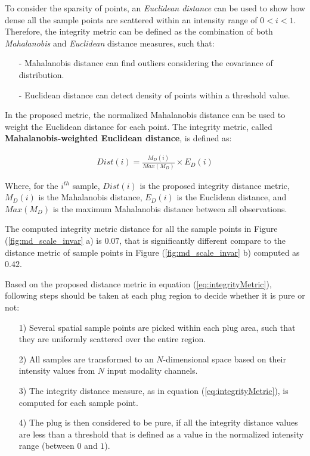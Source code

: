 To consider the sparsity of points, an \textit{Euclidean distance} can be used to show how dense all the sample points are scattered within an intensity range of $0<i<1$. Therefore, the integrity metric can be defined as the combination of both \textit{Mahalanobis} and \textit{Euclidean} distance measures, such that:

\begin{itemize}
    \item[-] Mahalanobis distance can find outliers considering the covariance of distribution.
    \item[-] Euclidean distance can detect density of points within a threshold value.
\end{itemize}

In the proposed metric, the normalized Mahalanobis distance can be used to weight the Euclidean distance for each point. The integrity metric, called \textbf{Mahalanobis-weighted Euclidean distance}, is defined as:

\begin{equation}
\label{eq:integrityMetric}
\begin{gathered}
Dist(i) = \frac{M_D(i)}{Max(M_D)} \times E_D(i)
\end{gathered}
\end{equation}

Where, for the $i^{th}$ sample, $Dist(i)$ is the proposed integrity distance metric, $M_D(i)$ is the Mahalanobis distance, $E_D(i)$ is the Euclidean distance, and $Max(M_D)$ is the maximum Mahalanobis distance between all observations.

The computed integrity metric distance for all the sample points in Figure (\ref{fig:md_scale_invar} a) is $0.07$, that is significantly different compare to the distance metric of sample points in Figure (\ref{fig:md_scale_invar} b) computed as $0.42$.

Based on the proposed distance metric in equation (\ref{eq:integrityMetric}), following steps should be taken at each plug region to decide whether it is pure or not:

\begin{itemize}
    \item[1)] Several spatial sample points are picked within each plug area, such that they are uniformly scattered over the entire region.
    \item[2)] All samples are transformed to an $N$-dimensional space based on their intensity values from $N$ input modality channels.
    \item[3)] The integrity distance measure, as in equation (\ref{eq:integrityMetric}), is computed for each sample point.
    \item[4)] The plug is then considered to be pure, if all the integrity distance values are less than a threshold that is defined as a value in the normalized intensity range (between $0$ and $1$).
\end{itemize}

